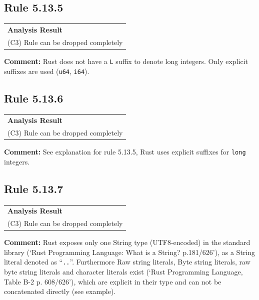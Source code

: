 \subsection*{Rule 5.13.5}
\begin{longtable}{p{13cm}}
\textbf{Analysis Result} \\
(C3) Rule can be dropped completely \\
\end{longtable}
\textbf{Comment:} Rust does not have a \texttt{L} suffix to denote long integers. Only explicit suffixes are used (\texttt{u64}, \texttt{i64}). \\


\subsection*{Rule 5.13.6}
\begin{longtable}{p{13cm}}
\textbf{Analysis Result} \\
(C3) Rule can be dropped completely \\
\end{longtable}
\textbf{Comment:} See explanation for rule 5.13.5, Rust uses explicit suffixes for \texttt{long} integers. \\
\subsection*{Rule 5.13.7}
\begin{longtable}{p{13cm}}
\textbf{Analysis Result} \\
(C3) Rule can be dropped completely \\
\end{longtable}
\textbf{Comment:} Rust exposes only one String type (UTF8-encoded) in the standard library (`Rust Programming Language: What is a String? p.181/626'), as a String literal denoted as ``\texttt{..}''. Furthermore Raw string literals, Byte string literals, raw byte string literals and character literals exist (`Rust Programming Language, Table B-2 p. 608/626'), which are explicit in their type and can not be concatenated directly (see example). \\


